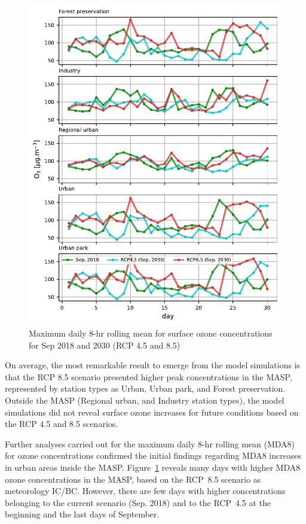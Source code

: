 \begin{figure}[!hbt]
\begin{center}
	\includegraphics{fig/MDA8_type_rcps}
\end{center}
  \caption{Maximum daily 8-hr rolling mean for surface ozone concentrations for Sep 2018 and 2030 (RCP 4.5 and 8.5)}
  \label{fig:MDA8_rcps}
\end{figure}

On average, the most remarkable result to emerge from the model simulations is that the RCP 8.5 scenario presented higher peak concentrations in the MASP, represented by station types as Urban, Urban park, and Forest preservation.
Outside the MASP (Regional urban, and Industry station types), the model simulations did not reveal surface ozone increases for future conditions based on the RCP 4.5 and 8.5 scenarios.   

Further analyses carried out for the maximum daily 8-hr rolling mean (MDA8) for ozone concentrations confirmed the initial findings regarding MDA8 increases in urban areas inside the MASP.
Figure~\ref{fig:MDA8_rcps} reveals many days with higher MDA8 ozone concentrations in the MASP, based on the RCP~8.5 scenario as meteorology IC/BC.
However, there are few days with higher concentrations belonging to the current scenario (Sep. 2018) and to the RCP~4.5 at the beginning and the last days of September.

